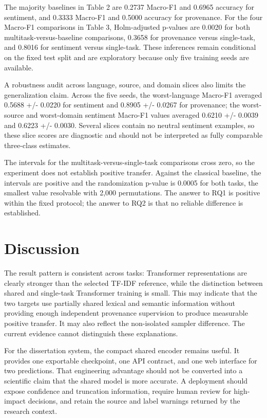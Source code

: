 \documentclass[11pt,a4paper]{article}
\begin{document}
The majority baselines in Table 2 are 0.2737 Macro-F1 and 0.6965
accuracy for sentiment, and 0.3333 Macro-F1 and 0.5000 accuracy for
provenance. For the four Macro-F1 comparisons in Table 3, Holm-adjusted
p-values are 0.0020 for both multitask-versus-baseline comparisons,
0.3658 for provenance versus single-task, and 0.8016 for sentiment
versus single-task. These inferences remain conditional on the fixed
test split and are exploratory because only five training seeds are
available.

A robustness audit across language, source, and domain slices also
limits the generalization claim. Across the five seeds, the
worst-language Macro-F1 averaged 0.5688 +/- 0.0220 for sentiment and
0.8905 +/- 0.0267 for provenance; the worst-source and worst-domain
sentiment Macro-F1 values averaged 0.6210 +/- 0.0039 and 0.6223 +/-
0.0030. Several slices contain no neutral sentiment examples, so these
slice scores are diagnostic and should not be interpreted as fully
comparable three-class estimates.

The intervals for the multitask-versus-single-task comparisons cross
zero, so the experiment does not establish positive transfer. Against
the classical baseline, the intervals are positive and the randomization
p-value is 0.0005 for both tasks, the smallest value resolvable with
2,000 permutations. The answer to RQ1 is positive within the fixed
protocol; the answer to RQ2 is that no reliable difference is
established.

\section{Discussion}

The result pattern is consistent across tasks: Transformer
representations are clearly stronger than the selected TF-IDF reference,
while the distinction between shared and single-task Transformer
training is small. This may indicate that the two targets use partially
shared lexical and semantic information without providing enough
independent provenance supervision to produce measurable positive
transfer. It may also reflect the non-isolated sampler difference. The
current evidence cannot distinguish these explanations.

For the dissertation system, the compact shared encoder remains useful.
It provides one exportable checkpoint, one API contract, and one web
interface for two predictions. That engineering advantage should not be
converted into a scientific claim that the shared model is more
accurate. A deployment should expose confidence and truncation
information, require human review for high-impact decisions, and retain
the source and label warnings returned by the research context.
\end{document}

